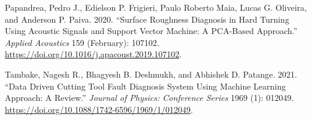 \documentclass[
  letterpaper,
  DIV=11,
  numbers=noendperiod]{scrartcl}
\newlength{\cslhangindent}
\newenvironment{CSLReferences}[2] %
 {\begin{list}{}{%
  \setlength{\itemindent}{0pt}
  \setlength{\leftmargin}{0pt}
  \setlength{\parsep}{0pt}
  \ifodd #1
   \setlength{\leftmargin}{\cslhangindent}
   \setlength{\itemindent}{-1\cslhangindent}
  \fi
  \setlength{\itemsep}{#2\baselineskip}}}
 {\end{list}}
\begin{document}
\begin{CSLReferences}{1}{0}
Papandrea, Pedro J., Edielson P. Frigieri, Paulo Roberto Maia, Lucas G.
Oliveira, and Anderson P. Paiva. 2020. {``Surface Roughness Diagnosis in
Hard Turning Using Acoustic Signals and Support Vector Machine: {A}
{PCA}-Based Approach.''} \emph{Applied Acoustics} 159 (February):
107102. \url{https://doi.org/10.1016/j.apacoust.2019.107102}.

Tambake, Nagesh R., Bhagyesh B. Deshmukh, and Abhishek D. Patange. 2021.
{``Data {Driven} {Cutting} {Tool} {Fault} {Diagnosis} {System} {Using}
{Machine} {Learning} {Approach}: {A} {Review}.''} \emph{Journal of
Physics: Conference Series} 1969 (1): 012049.
\url{https://doi.org/10.1088/1742-6596/1969/1/012049}.

\end{CSLReferences}
\end{document}
